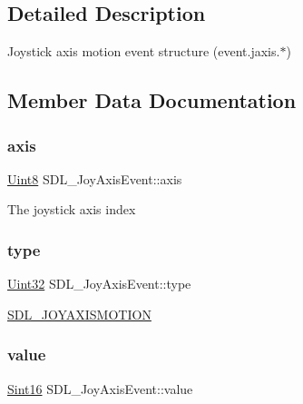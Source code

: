 \subsection{Detailed Description}
Joystick axis motion event structure (event.\+jaxis.$\ast$) 

\subsection{Member Data Documentation}
\mbox{\label{struct_s_d_l___joy_axis_event_a0beac2fb161e45771c424bd0b6daeabb}} 
\subsubsection{\texorpdfstring{axis}{axis}}
{\footnotesize\ttfamily \hyperlink{_s_d_l__stdinc_8h_a2944638813a090aa23e62f4da842c3e2}{Uint8} S\+D\+L\+\_\+\+Joy\+Axis\+Event\+::axis}

The joystick axis index \mbox{\label{struct_s_d_l___joy_axis_event_aed1c873fb90ba58194e65f972933c67d}} 
\subsubsection{\texorpdfstring{type}{type}}
{\footnotesize\ttfamily \hyperlink{_s_d_l__stdinc_8h_add440eff171ea5f55cb00c4a9ab8672d}{Uint32} S\+D\+L\+\_\+\+Joy\+Axis\+Event\+::type}

\hyperlink{_s_d_l__events_8h_a3b589e89be6b35c02e0dd34a55f3fccaaf0803b3f8a12de3d85f81ebd7b514cd1}{S\+D\+L\+\_\+\+J\+O\+Y\+A\+X\+I\+S\+M\+O\+T\+I\+ON} \mbox{\label{struct_s_d_l___joy_axis_event_a53ee73e7c367934dd6edb69963be5556}} 
\subsubsection{\texorpdfstring{value}{value}}
{\footnotesize\ttfamily \hyperlink{_s_d_l__stdinc_8h_a9d0257032c0e146ab6121bf0122712f5}{Sint16} S\+D\+L\+\_\+\+Joy\+Axis\+Event\+::value}

